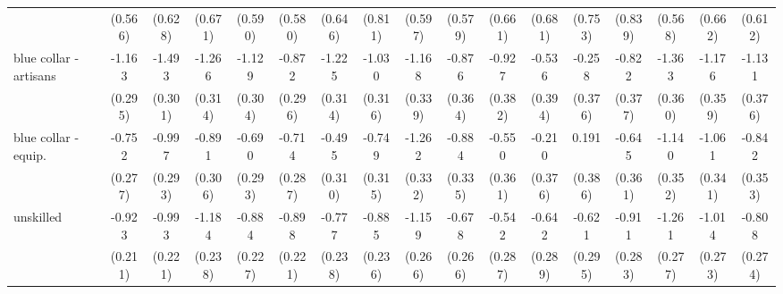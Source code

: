 {\begin{tabular}{l*{16}{c}}
                    &     (0.566)         &     (0.628)         &     (0.671)         &     (0.590)         &     (0.580)         &     (0.646)         &     (0.811)         &     (0.597)         &     (0.579)         &     (0.661)         &     (0.681)         &     (0.753)         &     (0.839)         &     (0.568)         &     (0.662)         &     (0.612)         \\
[1em]
blue collar - artisans&      -1.163\sym{***}&      -1.493\sym{***}&      -1.266\sym{***}&      -1.129\sym{***}&      -0.872\sym{**} &      -1.225\sym{***}&      -1.030\sym{**} &      -1.168\sym{***}&      -0.876\sym{*}  &      -0.927\sym{*}  &      -0.536         &      -0.258         &      -0.822\sym{*}  &      -1.363\sym{***}&      -1.176\sym{**} &      -1.131\sym{**} \\
                    &     (0.295)         &     (0.301)         &     (0.314)         &     (0.304)         &     (0.296)         &     (0.314)         &     (0.316)         &     (0.339)         &     (0.364)         &     (0.382)         &     (0.394)         &     (0.376)         &     (0.377)         &     (0.360)         &     (0.359)         &     (0.376)         \\
[1em]
blue collar - equip.&      -0.752\sym{**} &      -0.997\sym{***}&      -0.891\sym{**} &      -0.690\sym{*}  &      -0.714\sym{*}  &      -0.495         &      -0.749\sym{*}  &      -1.262\sym{***}&      -0.884\sym{**} &      -0.550         &      -0.210         &       0.191         &      -0.645         &      -1.140\sym{**} &      -1.061\sym{**} &      -0.842\sym{*}  \\
                    &     (0.277)         &     (0.293)         &     (0.306)         &     (0.293)         &     (0.287)         &     (0.310)         &     (0.315)         &     (0.332)         &     (0.335)         &     (0.361)         &     (0.376)         &     (0.386)         &     (0.361)         &     (0.352)         &     (0.341)         &     (0.353)         \\
[1em]
unskilled           &      -0.923\sym{***}&      -0.993\sym{***}&      -1.184\sym{***}&      -0.884\sym{***}&      -0.898\sym{***}&      -0.777\sym{**} &      -0.885\sym{***}&      -1.159\sym{***}&      -0.678\sym{*}  &      -0.542         &      -0.642\sym{*}  &      -0.621\sym{*}  &      -0.911\sym{**} &      -1.261\sym{***}&      -1.014\sym{***}&      -0.808\sym{**} \\
                    &     (0.211)         &     (0.221)         &     (0.238)         &     (0.227)         &     (0.221)         &     (0.238)         &     (0.236)         &     (0.266)         &     (0.266)         &     (0.287)         &     (0.289)         &     (0.295)         &     (0.283)         &     (0.277)         &     (0.273)         &     (0.274)         \\

\end{tabular}}
